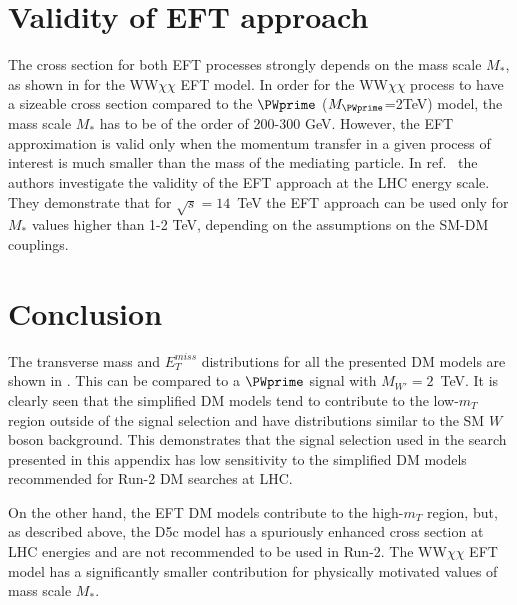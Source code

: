 





\section{Validity of EFT approach}

The cross section for both EFT processes strongly depends on the mass scale $M_{*}$,
as shown in  for the WW$\chi\chi$ EFT model.
In order for the WW$\chi\chi$ process to have a sizeable cross section compared to the $\PWprime$ ($M_{\PWprime}$=2TeV) model, 
the mass scale $M_{*}$ has to be of the order of 200-300 GeV. 
However, the EFT approximation is valid only when the momentum transfer in a given
process of interest is much smaller than the mass of the mediating
particle. 
In ref.~\cite{eft_validity_limits} the authors investigate the validity of the EFT approach at
the LHC energy scale. They demonstrate that for $\sqrt{s} = 14$~TeV the 
EFT approach can be used only for $M_{*}$ values higher than 1-2 TeV, depending on the assumptions on the SM-DM couplings.

\section{Conclusion}

The transverse mass and $E_{T}^{miss}$ distributions for all the presented DM models are shown in . This can be compared to a $\PWprime$ signal with $M_{W'} = 2$~TeV.
It is clearly seen that the simplified DM models tend to contribute to the low-$m_{T}$ region
outside of the signal selection and have distributions similar to the SM $W$ boson background.
This demonstrates that the signal selection used in the search presented in this appendix 
has low sensitivity to the simplified DM models recommended for Run-2 DM searches at LHC.

On the other hand, the EFT DM models contribute to the high-$m_{T}$ region, but, as described above, the D5c model has a spuriously enhanced cross section at LHC energies and are not recommended to be used in Run-2. The WW$\chi\chi$ EFT model has a significantly smaller contribution for physically motivated values of mass scale $M_{*}$.


